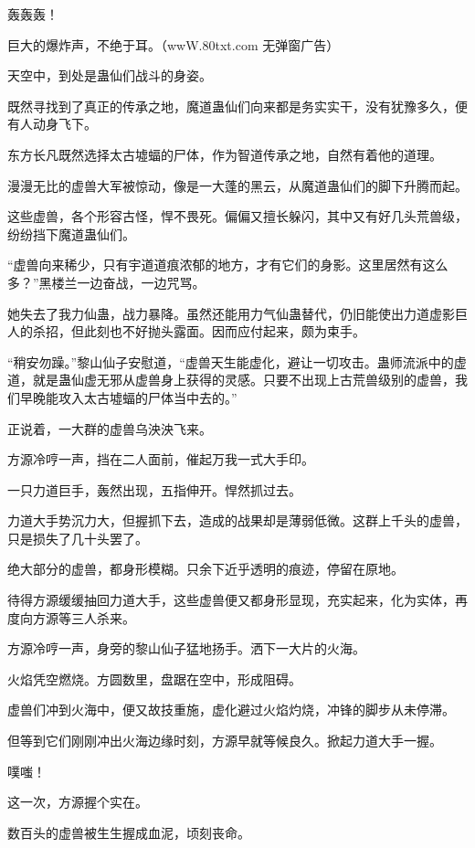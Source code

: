 
\begin{this_body}

轰轰轰！

巨大的爆炸声，不绝于耳。（wwW.80txt.com 无弹窗广告）

天空中，到处是蛊仙们战斗的身姿。

既然寻找到了真正的传承之地，魔道蛊仙们向来都是务实实干，没有犹豫多久，便有人动身飞下。

东方长凡既然选择太古墟蝠的尸体，作为智道传承之地，自然有着他的道理。

漫漫无比的虚兽大军被惊动，像是一大蓬的黑云，从魔道蛊仙们的脚下升腾而起。

这些虚兽，各个形容古怪，悍不畏死。偏偏又擅长躲闪，其中又有好几头荒兽级，纷纷挡下魔道蛊仙们。

“虚兽向来稀少，只有宇道道痕浓郁的地方，才有它们的身影。这里居然有这么多？”黑楼兰一边奋战，一边咒骂。

她失去了我力仙蛊，战力暴降。虽然还能用力气仙蛊替代，仍旧能使出力道虚影巨人的杀招，但此刻也不好抛头露面。因而应付起来，颇为束手。

“稍安勿躁。”黎山仙子安慰道，“虚兽天生能虚化，避让一切攻击。蛊师流派中的虚道，就是蛊仙虚无邪从虚兽身上获得的灵感。只要不出现上古荒兽级别的虚兽，我们早晚能攻入太古墟蝠的尸体当中去的。”

正说着，一大群的虚兽乌泱泱飞来。

方源冷哼一声，挡在二人面前，催起万我一式大手印。

一只力道巨手，轰然出现，五指伸开。悍然抓过去。

力道大手势沉力大，但握抓下去，造成的战果却是薄弱低微。这群上千头的虚兽，只是损失了几十头罢了。

绝大部分的虚兽，都身形模糊。只余下近乎透明的痕迹，停留在原地。

待得方源缓缓抽回力道大手，这些虚兽便又都身形显现，充实起来，化为实体，再度向方源等三人杀来。

方源冷哼一声，身旁的黎山仙子猛地扬手。洒下一大片的火海。

火焰凭空燃烧。方圆数里，盘踞在空中，形成阻碍。

虚兽们冲到火海中，便又故技重施，虚化避过火焰灼烧，冲锋的脚步从未停滞。

但等到它们刚刚冲出火海边缘时刻，方源早就等候良久。掀起力道大手一握。

噗嗤！

这一次，方源握个实在。

数百头的虚兽被生生握成血泥，顷刻丧命。


\end{this_body}

